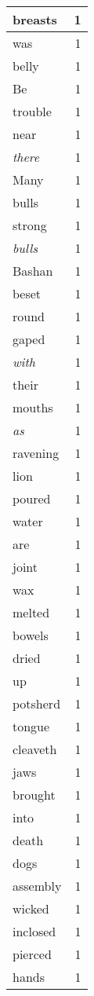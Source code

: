 \begin{center}
\begin{longtable}{l|r}
breasts & 1 \\ \hline
was & 1 \\ \hline
belly & 1 \\ \hline
Be & 1 \\ \hline
trouble & 1 \\ \hline
near & 1 \\ \hline
\emph{there} & 1 \\ \hline
Many & 1 \\ \hline
bulls & 1 \\ \hline
strong & 1 \\ \hline
\emph{bulls} & 1 \\ \hline
Bashan & 1 \\ \hline
beset & 1 \\ \hline
round & 1 \\ \hline
gaped & 1 \\ \hline
\emph{with} & 1 \\ \hline
their & 1 \\ \hline
mouths & 1 \\ \hline
\emph{as} & 1 \\ \hline
ravening & 1 \\ \hline
lion & 1 \\ \hline
poured & 1 \\ \hline
water & 1 \\ \hline
are & 1 \\ \hline
joint & 1 \\ \hline
wax & 1 \\ \hline
melted & 1 \\ \hline
bowels & 1 \\ \hline
dried & 1 \\ \hline
up & 1 \\ \hline
potsherd & 1 \\ \hline
tongue & 1 \\ \hline
cleaveth & 1 \\ \hline
jaws & 1 \\ \hline
brought & 1 \\ \hline
into & 1 \\ \hline
death & 1 \\ \hline
dogs & 1 \\ \hline
assembly & 1 \\ \hline
wicked & 1 \\ \hline
inclosed & 1 \\ \hline
pierced & 1 \\ \hline
hands & 1 \\ \hline

\end{longtable}
\end{center}
